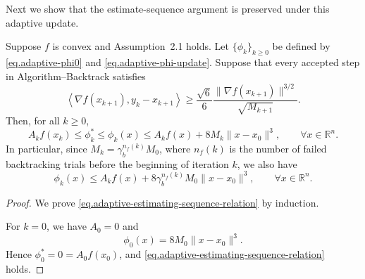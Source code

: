 \begin{itemize}
{              Next we show that the estimate-sequence argument is preserved under this adaptive update.

              \begin{lemma}
                  \label{lem.adaptive-estimate-sequence}
                  Suppose \(f\) is convex and Assumption~2.1 holds. Let \(\{\phi_k\}_{k\ge0}\) be defined by \eqref{eq.adaptive-phi0} and \eqref{eq.adaptive-phi-update}. Suppose that every accepted step in Algorithm--Backtrack satisfies
                  \begin{equation}
                      \label{eq.accepted-bt-condition}
                      \left\langle \nabla f(x_{k+1}),y_k-x_{k+1}\right\rangle
                      \ge
                      \frac{\sqrt 6}{6}
                      \frac{\|\nabla f(x_{k+1})\|^{3/2}}{\sqrt{M_{k+1}}}.
                  \end{equation}
                  Then, for all \(k\ge0\),
                  \begin{equation}
                      \label{eq.adaptive-estimating-sequence-relation}
                      A_k f(x_k)
                      \le
                      \phi_k^*
                      \le
                      \phi_k(x)
                      \le
                      A_k f(x)+8M_k\|x-x_0\|^3,
                      \qquad
                      \forall x\in\mathbb R^n.
                  \end{equation}
                  In particular, since \(M_k=\gamma_b^{n_f(k)}M_0\), where \(n_f(k)\) is the number of failed backtracking trials before the beginning of iteration \(k\), we also have
                  \begin{equation}
                      \label{eq.adaptive-estimating-sequence-relation-nf}
                      \phi_k(x)
                      \le
                      A_k f(x)+8\gamma_b^{n_f(k)}M_0\|x-x_0\|^3,
                      \qquad
                      \forall x\in\mathbb R^n.
                  \end{equation}
              \end{lemma}

              \begin{proof}
                  We prove \eqref{eq.adaptive-estimating-sequence-relation} by induction.

                  For \(k=0\), we have \(A_0=0\) and
                  \[
                      \phi_0(x)=8M_0\|x-x_0\|^3.
                  \]
                  Hence \(\phi_0^*=0=A_0f(x_0)\), and \eqref{eq.adaptive-estimating-sequence-relation} holds.


\end{proof}}
\end{itemize}
